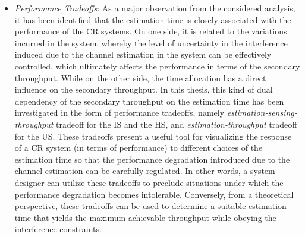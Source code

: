 \begin{itemize}
\item \textit{Performance Tradeoffs}: 
As a major observation from the considered analysis, it has been identified that the estimation time is closely associated with the performance of the CR systems. On one side, it is related to the variations incurred in the system, whereby the level of uncertainty in the interference induced due to the channel estimation in the system can be effectively controlled, which ultimately affects the performance in terms of the secondary throughput. While on the other side, the time allocation has a direct influence on the secondary throughput. In this thesis, this kind of dual dependency of the secondary throughput on the estimation time has been investigated in the form of performance tradeoffs, namely \textit{estimation-sensing-throughput} tradeoff for the IS and the HS, and \textit{estimation-throughput} tradeoff for the US. These tradeoffs present a useful tool for visualizing the response of a CR system (in terms of performance) to different choices of the estimation time so that the performance degradation introduced due to the channel estimation can be carefully regulated. In other words, a system designer can utilize these tradeoffs to preclude situations under which the performance degradation becomes intolerable. Conversely, from a theoretical perspective, these tradeoffs can be used to determine a suitable estimation time that yields the maximum achievable throughput while obeying the interference constraints.
 

\end{itemize}
